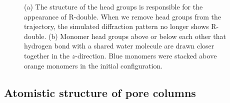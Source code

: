 \documentclass[journal=jpcbfk,manuscript=article]{achemso}
\begin{document}
\begin{figure}[!htb]
\begin{subfigure}{0.45\textwidth}
  \caption{}\label{fig:hbond_visualization}
  \end{subfigure}
  \caption{(a) The structure of the head groups is responsible for the appearance of
  R-double. When we remove head groups from the trajectory, the simulated 
  diffraction pattern no longer shows R-double. (b) Monomer head groups above or below
  each other that hydrogen bond with a shared water molecule are drawn closer
  together in the $z$-direction. Blue monomers were stacked above orange monomers in the
  initial configuration. 
  }\label{fig:hbonds}
  \end{figure}
  
  \subsection{Atomistic structure of pore columns}
\end{document}

